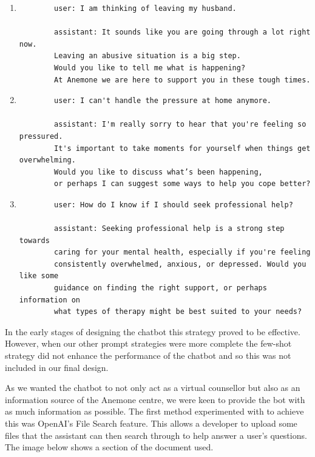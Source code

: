\begin{enumerate}
	\item 
	\begin{verbatim}
        user: I am thinking of leaving my husband.

        assistant: It sounds like you are going through a lot right now. 
        Leaving an abusive situation is a big step. 
        Would you like to tell me what is happening? 
        At Anemone we are here to support you in these tough times.
	\end{verbatim}
	\item
	\begin{verbatim}
        user: I can't handle the pressure at home anymore.

        assistant: I'm really sorry to hear that you're feeling so pressured. 
        It's important to take moments for yourself when things get overwhelming. 
        Would you like to discuss what’s been happening,
        or perhaps I can suggest some ways to help you cope better?
	\end{verbatim}
    \item
	\begin{verbatim}
        user: How do I know if I should seek professional help?
        
        assistant: Seeking professional help is a strong step towards
        caring for your mental health, especially if you're feeling
        consistently overwhelmed, anxious, or depressed. Would you like some
        guidance on finding the right support, or perhaps information on
        what types of therapy might be best suited to your needs?
	\end{verbatim}

\end{enumerate}

In the early stages of designing the chatbot this strategy proved to be effective. However, when our other prompt strategies were more complete the few-shot strategy did not enhance the performance of the chatbot and so this was not included in our final design. 

As we wanted the chatbot to not only act as a virtual counsellor but also as an information source of the Anemone centre, we were keen to provide the bot with as much information as possible.
The first method experimented with to achieve this was OpenAI's File Search feature. This allows a developer to upload some files that the assistant can then search through to help answer a user's questions. 
The image below shows a section of the document used. 

